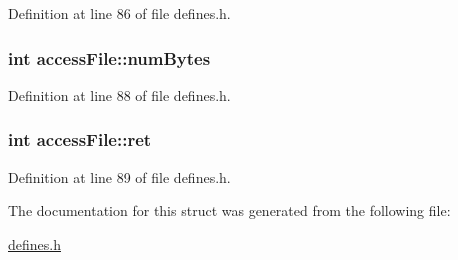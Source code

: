 Definition at line 86 of file defines.\-h.

\hypertarget{structaccess_file_a88da95f58ee0db9eff5d9fae8d94585f}{
\subsubsection[{num\-Bytes}]{\setlength{\rightskip}{0pt plus 5cm}int access\-File\-::num\-Bytes}}\label{structaccess_file_a88da95f58ee0db9eff5d9fae8d94585f}


Definition at line 88 of file defines.\-h.

\hypertarget{structaccess_file_af78cfca94c3c5287dd6b843953eb1052}{
\subsubsection[{ret}]{\setlength{\rightskip}{0pt plus 5cm}int access\-File\-::ret}}\label{structaccess_file_af78cfca94c3c5287dd6b843953eb1052}


Definition at line 89 of file defines.\-h.



The documentation for this struct was generated from the following file\-:\begin{DoxyCompactItemize}
\item 
\hyperlink{defines_8h}{defines.\-h}\end{DoxyCompactItemize}
